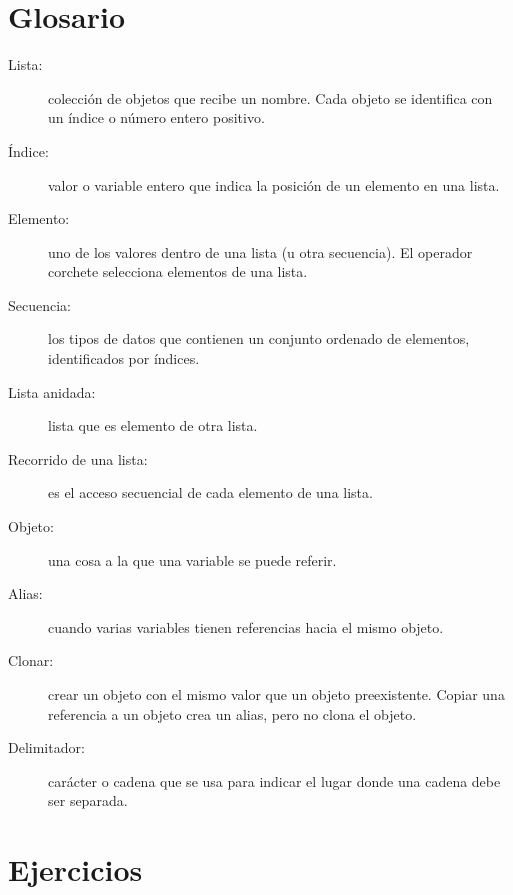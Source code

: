 \section{Glosario}

\begin{description}

\item[Lista:] colección de objetos que recibe un nombre. Cada objeto se
identifica con un índice o número entero positivo.

\item[Índice:] valor o variable entero que indica la posición de un elemento en una lista.

\item[Elemento:] uno de los valores dentro de una lista (u otra secuencia).  El 
operador corchete selecciona elementos de una lista.

\item[Secuencia:] los tipos de datos que contienen un conjunto ordenado de
elementos, identificados por índices.

\item[Lista anidada:] lista que es elemento de otra lista.

\item[Recorrido de una lista:] es el acceso secuencial de cada elemento de una lista.

\item[Objeto:] una cosa a la que una variable se puede referir.

\item[Alias:] cuando varias variables tienen referencias hacia el mismo objeto.

\item[Clonar:] crear un objeto con el mismo valor que un objeto preexistente.
Copiar una referencia a un objeto crea un alias, pero no clona el objeto.

\item[Delimitador:] carácter o cadena que se usa para indicar el lugar donde una cadena debe ser separada.


\end{description}

\section{Ejercicios}



